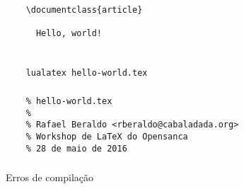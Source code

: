 \begin{frame}[standout]
  \huge
\end{frame}

\begin{frame}[fragile]
  \frametitle{}
  \begin{verbatim}
    \documentclass{article}
    
      Hello, world!
    
  \end{verbatim}
\end{frame}

\begin{frame}[fragile]
  \frametitle{}
  \begin{verbatim}
    lualatex hello-world.tex
  \end{verbatim}
\end{frame}

\begin{frame}[fragile]
  \frametitle{}
  \begin{verbatim}
    % hello-world.tex
    %
    % Rafael Beraldo <rberaldo@cabaladada.org>
    % Workshop de LaTeX do Opensanca
    % 28 de maio de 2016
  \end{verbatim}
\end{frame}

\begin{frame}
  \frametitle{}
  \Huge
  Erros de compilação
\end{frame}
